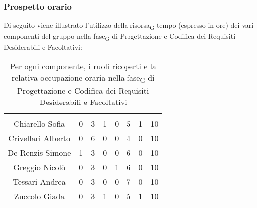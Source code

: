 \subsubsection{Prospetto orario}
Di seguito viene illustrato l'utilizzo della \gls{risorsa}\textsubscript{G} tempo (espresso in ore) dei vari componenti del gruppo nella \gls{fase}\textsubscript{G} di Progettazione e Codifica dei Requisiti Desiderabili e Facoltativi:

\begin{table}[H]
	\begin{center}
		\begin{tabular}{c
				!{\color[HTML]{9b240a}\vrule width 1pt}
				cccccc
				!{\color[HTML]{9b240a}\vrule width 1pt}	
				c}
			\rowcolorhead
			 &  &  &  &  &  &  &  \\
			
			Chiarello Sofia & 0 & 3 & 1 & 0 & 5 & 1 & 10\\
			Crivellari Alberto & 0 & 6 & 0 & 0 & 4 & 0 & 10\\
			De Renzis Simone & 1 & 3 & 0 & 0 & 6 & 0 & 10\\
			Greggio Nicolò & 0 & 3 & 0 & 1 & 6 & 0 & 10\\
			Tessari Andrea & 0 & 3 & 0 & 0 & 7 & 0 & 10\\
			Zuccolo Giada & 0 & 3 & 1 & 0 & 5 & 1 & 10\\
		\end{tabular}
		\caption[Occupazione oraria Progettazione e Codifica dei Requisiti Desiderabili e Facoltativi]{Per ogni componente, i ruoli ricoperti e la relativa occupazione oraria nella \gls{fase}\textsubscript{G} di Progettazione e Codifica dei Requisiti Desiderabili e Facoltativi}
	\end{center}
\end{table}


